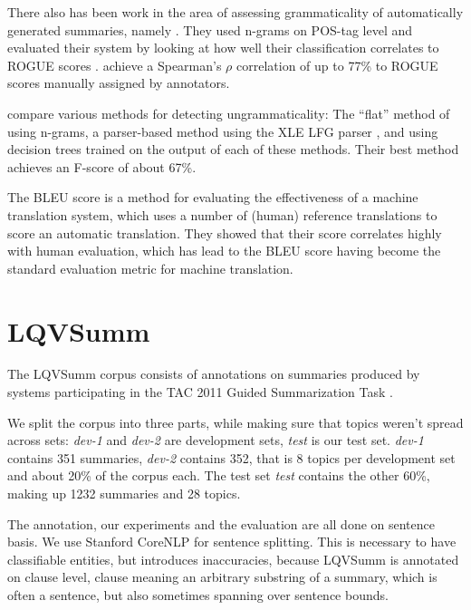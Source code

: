 \documentclass[a4paper,10pt]{scrartcl}
\theoremstyle{style}
\begin{document}
There also has been work in the area of assessing grammaticality of automatically generated summaries, namely \cite{vadlapudi2010automated}. They used n-grams on POS-tag level and evaluated their system by looking at how well their classification correlates to ROGUE scores \citep{lin2004rouge}. \citeauthor{vadlapudi2010automated} achieve a Spearman's $\rho{}$ correlation of up to 77\% to ROGUE scores manually assigned by annotators.

\cite{wagner2007comparative} compare various methods for detecting ungrammaticality: The ``flat'' method of using n-grams, a parser-based method using the XLE LFG parser \citep{maxwell1996efficient}, and using decision trees trained on the output of each of these methods. Their best method achieves an F-score of about 67\%.

The BLEU score \citep{papineni2002bleu} is a method for evaluating the effectiveness of a machine translation system, which uses a number of (human) reference translations to score an automatic translation. They showed that their score correlates highly with human evaluation, which has lead to the BLEU score having become the standard evaluation metric for machine translation.

\section{LQVSumm}
\label{corpus_study}
The LQVSumm corpus consists of annotations on summaries produced by systems participating in the TAC 2011 Guided Summarization Task \citep{owczarzak2011overview}.

We split the corpus into three parts, while making sure that topics weren't spread across sets: \textit{dev-1} and \textit{dev-2} are development sets, \textit{test} is our test set.
\textit{dev-1} contains 351 summaries, \textit{dev-2} contains 352, that is 8 topics per development set and about 20\% of the corpus each.
The test set \textit{test} contains the other 60\%, making up 1232 summaries and 28 topics.

The annotation, our experiments and the evaluation are all done on sentence basis. We use Stanford CoreNLP \citep{manning-EtAl:2014:P14-5} for sentence splitting. This is necessary to have classifiable entities, but introduces inaccuracies, because LQVSumm is annotated on clause level, clause meaning an arbitrary substring of a summary, which is often a sentence, but also sometimes spanning over sentence bounds.
\end{document}
